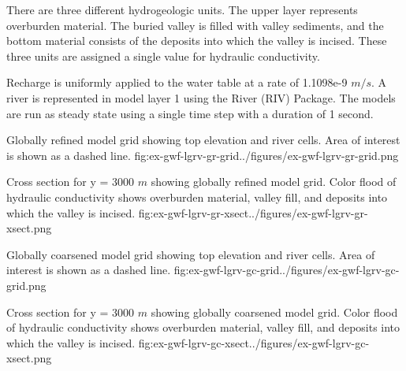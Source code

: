 There are three different hydrogeologic units.  The upper layer represents overburden material.  The buried valley is filled with valley sediments, and the bottom material consists of the deposits into which the valley is incised.  These three units are assigned a single value for hydraulic conductivity.

Recharge is uniformly applied to the water table at a rate of 1.1098e-9 $m/s$.  A river is represented in model layer 1 using the River (RIV) Package.  The models are run as steady state using a single time step with a duration of 1 second. 





\begin{StandardFigure}{
                                     Globally refined model grid showing top elevation and river cells.  Area of interest is shown as a dashed line.
                                     }{fig:ex-gwf-lgrv-gr-grid}{../figures/ex-gwf-lgrv-gr-grid.png}
\end{StandardFigure}                                 

\begin{StandardFigure}{
                                     Cross section for y = 3000 $m$ showing globally refined model grid.  Color flood of hydraulic conductivity shows overburden material, valley fill, and deposits into which the valley is incised.
                                     }{fig:ex-gwf-lgrv-gr-xsect}{../figures/ex-gwf-lgrv-gr-xsect.png}
\end{StandardFigure}                                 

\begin{StandardFigure}{
                                     Globally coarsened model grid showing top elevation and river cells.  Area of interest is shown as a dashed line.
                                     }{fig:ex-gwf-lgrv-gc-grid}{../figures/ex-gwf-lgrv-gc-grid.png}
\end{StandardFigure}                                 

\begin{StandardFigure}{
                                     Cross section for y = 3000 $m$ showing globally coarsened model grid.  Color flood of hydraulic conductivity shows overburden material, valley fill, and deposits into which the valley is incised.
                                     }{fig:ex-gwf-lgrv-gc-xsect}{../figures/ex-gwf-lgrv-gc-xsect.png}
\end{StandardFigure}                                 


